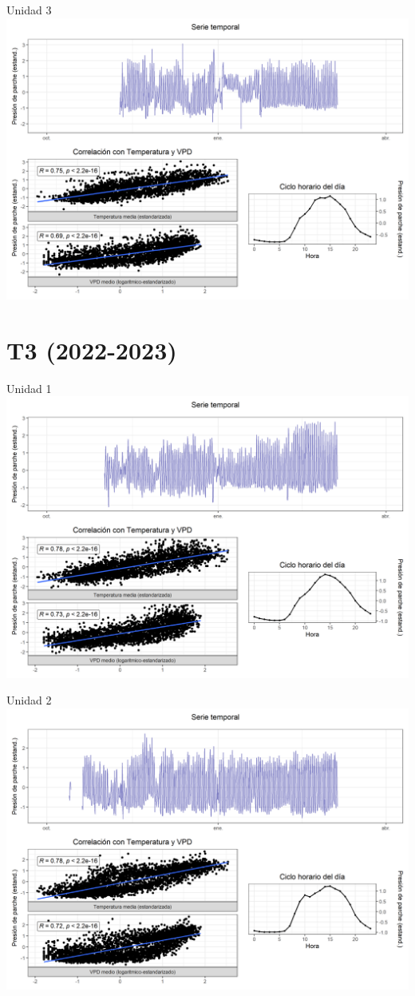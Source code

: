 \documentclass[
  letterpaper,
  DIV=11,
  numbers=noendperiod]{scrreprt}
\begin{document}
Unidad 3
\includegraphics{figuras/04_turgor_unidad/2022_2023_La_Esperanza_T2_Unidad_3.png}

\chapter{T3 (2022-2023)}

Unidad 1
\includegraphics{figuras/04_turgor_unidad/2022_2023_La_Esperanza_T3_Unidad_1.png}

Unidad 2
\includegraphics{figuras/04_turgor_unidad/2022_2023_La_Esperanza_T3_Unidad_2.png}
\end{document}
